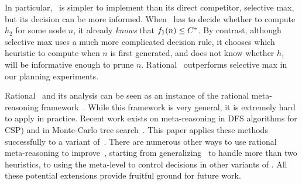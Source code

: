 In particular, \rationallazyastar~is simpler to implement than its direct
competitor, selective max, but its decision can be more informed.  When
\rationallazyastar~has to decide whether to compute $h_2$ for some node
$n$, it already {\em knows} that $f_1(n) \leq C^\ast$.  By contrast,
although selective max uses a much more complicated decision rule, it
chooses which heuristic to compute when $n$ is first generated, and does
not know whether $h_1$ will be informative enough to prune $n$. Rational
\lazyastar~outperforms selective max in our planning experiments.

Rational \lazyastar~and its analysis can be seen as an instance of the
rational meta-reasoning framework~\cite{Russell.right}. While
this framework is very general, it is extremely hard to
apply in practice. Recent work exists on meta-reasoning in DFS
algorithms for CSP) \cite{TolpinShimony.csp} and in Monte-Carlo tree
search~\cite{HayRussellTolpinShimony.selecting}. This paper applies these
methods successfully to a variant of~\astar.  There are numerous other
ways to use rational meta-reasoning to improve~\astar, starting from
generalizing \rationallazyastar~to handle more than two heuristics, to
using the meta-level to control decisions in other variants of \astar. All
these potential extensions provide fruitful ground for future work.
